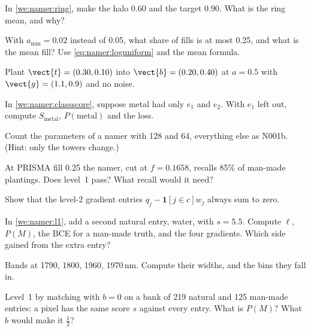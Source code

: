 \begin{checkyourself}
\item\label{ex:namer:1} In \cref{we:namer:ring}, make the halo 0.60 and the target 0.90. What is the ring mean, and why?
\item\label{ex:namer:2} With $a_{\min}=0.02$ instead of 0.05, what share of fills is at most 0.25, and what is the mean
  fill? Use \cref{eq:namer:loguniform} and the mean formula.
\item\label{ex:namer:3} Plant $\vect{t}=(0.30,0.10)$ into $\vect{b}=(0.20,0.40)$ at $a=0.5$ with $\vect{g}=(1.1,0.9)$
  and no noise.
\item\label{ex:namer:4} In \cref{we:namer:classscore}, suppose metal had only $e_1$ and $e_2$. With $e_1$ left out,
  compute $S_{\text{metal}}$, $P(\text{metal})$ and the loss.
\item\label{ex:namer:5} Count the parameters of a namer with  128 and  64, everything else as
  N001b. (Hint: only the towers change.)
\item\label{ex:namer:6} At PRISMA fill 0.25 the namer, cut at $f=0.1658$, recalls 85\% of man-made plantings. Does
  level~1 pass? What recall would it need?
\item\label{ex:namer:7} Show that the level-2 gradient entries $q_j-\mathbf{1}[j\in c]w_j$ always sum to zero.
\item\label{ex:namer:8} In \cref{we:namer:l1}, add a second natural entry, water, with $s=5.5$. Compute $\ell$, $P(M)$,
  the BCE for a man-made truth, and the four gradients. Which side gained from the extra entry?
\item\label{ex:namer:9} Bands at 1790, 1800, 1960, 1970\,nm. Compute their widths, and the bins they fall in.
\item\label{ex:namer:10} Level~1 by matching with $b=0$ on a bank of 219 natural and 125 man-made entries: a pixel has
  the same score $s$ against every entry. What is $P(M)$? What $b$ would make it $\frac12$?
\end{checkyourself}

